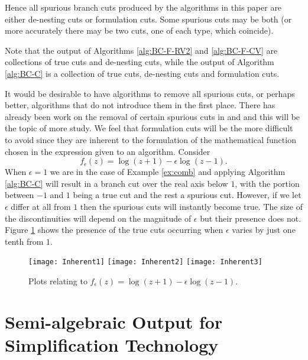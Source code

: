 \documentclass{llncs}
\begin{document}
Hence all spurious branch cuts produced by the algorithms in this paper are either de-nesting cuts or formulation cuts.  Some spurious cuts may be both (or more accurately there may be two cuts, one of each type, which coincide).

Note that the output of Algorithms \ref{alg:BC-F-RV2} and \ref{alg:BC-F-CV} are collections of true cuts and de-nesting cuts, while the output of Algorithm \ref{alg:BC-C} is a collection of true cuts, de-nesting cuts and formulation cuts. 

It would be desirable to have algorithms to remove all spurious cuts, or perhaps better, algorithms that do not introduce them in the first place.  There has already been work on the removal of certain spurious cuts in \cite{DF94} and \cite[etc.]{Phisanbut11} and this will be the topic of more study.  We feel that formulation cuts will be the more difficult to avoid since they are inherent to the formulation of the mathematical function chosen in the expression given to an algorithm.  Consider 
\[
f_{\epsilon}(z)=\log(z+1) - \epsilon\log(z-1).
\]
When $\epsilon=1$ we are in the case of Example \ref{ex:comb} and applying Algorithm \ref{alg:BC-C} will result in a branch cut over the real axis below $1$, with the portion between $-1$ and $1$ being a true cut and the rest a spurious cut.  However, if we let $\epsilon$ differ at all from $1$ then the spurious cuts will instantly become true.  The size of the discontinuities will depend on the magnitude of $\epsilon$ but their presence does not.  Figure \ref{fig:Inherent} shows the presence of the true cuts occurring when $\epsilon$ varies by just one tenth from $1$.  

\begin{figure}[ht] 
\begin{center}
\texttt{[image: Inherent1]}
\hspace*{0.3cm}
\texttt{[image: Inherent2]}
\hspace*{0.3cm}
\texttt{[image: Inherent3]}
\end{center}
\caption{Plots relating to $f_{\epsilon}(z)=\log(z+1) - \epsilon\log(z-1)$.} 
\label{fig:Inherent}
\end{figure}



\section{Semi-algebraic Output for Simplification Technology} \label{SEC:SA}
\end{document}
